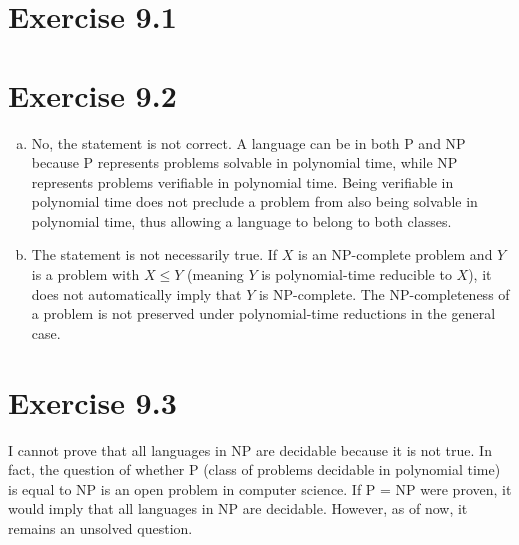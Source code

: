 \documentclass{article} %
\newcommand{\homeworkNumber}{9}
\begin{document}
\section*{Exercise \homeworkNumber.1}


\section*{Exercise \homeworkNumber.2}
\begin{enumerate}[(a)]
\item
No, the statement is not correct. A language can be in both P and NP because P represents problems solvable in polynomial time, while NP represents problems verifiable in polynomial time. Being verifiable in polynomial time does not preclude a problem from also being solvable in polynomial time, thus allowing a language to belong to both classes.

\item
The statement is not necessarily true. If $X$ is an NP-complete problem and $Y$ is a problem with $X \leq Y$ (meaning $Y$ is polynomial-time reducible to $X$), it does not automatically imply that $Y$ is NP-complete. The NP-completeness of a problem is not preserved under polynomial-time reductions in the general case.
\end{enumerate}

\section*{Exercise \homeworkNumber.3}
I cannot prove that all languages in NP are decidable because it is not true. In fact, the question of whether P (class of problems decidable in polynomial time) is equal to NP is an open problem in computer science. If P = NP were proven, it would imply that all languages in NP are decidable. However, as of now, it remains an unsolved question.
\end{document}

